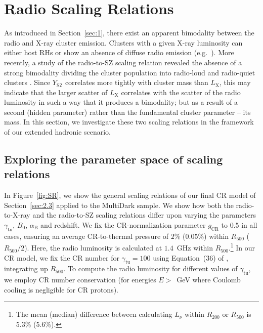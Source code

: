 \documentclass[traditabstract]{aa}
\newcommand{\rmn}{\mathrm}
\begin{document}
\section{Radio Scaling Relations}
\label{sec:4}
As introduced in Section~\ref{sec:1}, there exist an apparent bimodality between
the radio and X-ray cluster emission. Clusters with a given X-ray luminosity can
either host RHs or show an absence of diffuse radio emission
(e.g.~\citealp{2009A&A...507..661B,2011A&A...527A..99E}). More recently, a study
of the radio-to-SZ scaling relation revealed the absence of a strong bimodality
dividing the cluster population into radio-loud and radio-quiet clusters
\citep{2012MNRAS.421L.112B}. Since $Y_{\rmn{SZ}}$ correlates more tightly with
cluster mass than $L_{\rmn{X}}$, this may indicate that the larger scatter
of $L_{\rmn{X}}$ correlates with the scatter of the radio luminosity in such a way that
it produces a bimodality; but as a result of a second (hidden parameter) rather
than the fundamental cluster parameter -- its mass. In this section, we
investigate these two scaling relations in the framework of our extended
hadronic scenario.


\subsection{Exploring the parameter space of scaling relations}

In Figure~\ref{fig:SR}, we show the general scaling relations of our final CR
model of Section~\ref{sec:2.3} applied to the MultiDark sample. We show how both
the radio-to-X-ray and the radio-to-SZ scaling relations differ upon varying the
parameters $\gamma_{\rmn{tu}}$, $B_{0}$, $\alpha_{\rmn{B}}$ and redshift. We fix
the CR-normalization parameter $g_{\rmn{CR}}$ to 0.5 in all cases, ensuring an
average CR-to-thermal pressure of $2\%$ ($0.05\%$) within $R_{500}$
($R_{500}/2$). Here, the radio luminosity is calculated at $1.4$~GHz within
$R_{500}.$\footnote{The mean (median) difference between calculating $L_{\nu}$
  within $R_{200}$ or $R_{500}$ is 5.3\% (5.6\%).}  In our CR model, we fix the
CR number for $\gamma_{\rmn{tu}}=100$ using Equation~(36) of
\cite{2011A&A...527A..99E}, integrating up $R_{500}$. To compute the radio
luminosity for different values of $\gamma_{\rmn{tu}}$, we employ CR number
conservation (for energies $E>$~GeV where Coulomb cooling is negligible for CR
protons).
\end{document}
